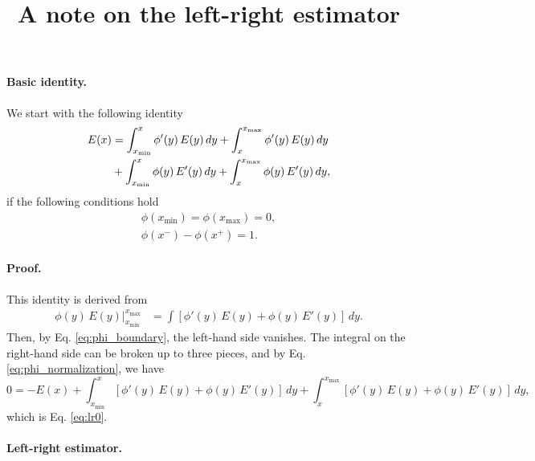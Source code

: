 \documentclass[12pt]{article}
\begin{document}
\title{A note on the left-right estimator}
\author{ \vspace{-10ex} }
\date{ \vspace{-10ex} }
\maketitle



\paragraph{Basic identity.}



We start with the following identity
\begin{align}
  E(x)
&=
  \int_{x_{\min}}^x \phi'(y) \, E(y) \, dy
  +
  \int_x^{x_{\max}} \phi'(y) \, E(y) \, dy
\notag
\\
&
  +
  \int_{x_{\min}}^x \phi(y) \, E'(y) \, dy
  +
  \int_x^{x_{\max}} \phi(y) \, E'(y) \, dy,
\label{eq:lr0}
\end{align}
if the following conditions hold
%
\begin{align}
  \phi(x_{\min}) = \phi(x_{\max}) = 0,
  \label{eq:phi_boundary}
\\
  \phi(x^{-}) - \phi(x^{+}) = 1.
  \label{eq:phi_normalization}
\end{align}


\paragraph{Proof.}



This identity is derived from
%
\begin{align*}
  \phi(y) \, E(y) \Big|_{x_{\min}}^{x_{\max}}
&=
  \int [\phi'(y) \, E(y) + \phi(y) \, E'(y)] \, dy.
\end{align*}
%
Then, by Eq. \eqref{eq:phi_boundary},
the left-hand side vanishes.
%
The integral on the right-hand side
can be broken up to three pieces,
and by Eq. \eqref{eq:phi_normalization},
we have
\[
0=-E(x)
+
  \int_{x_{\min}}^{x} [\phi'(y) \, E(y) + \phi(y) \, E'(y)] \, dy
+
  \int_{x}^{x_{\max}} [\phi'(y) \, E(y) + \phi(y) \, E'(y)] \, dy,
\]
which is Eq. \eqref{eq:lr0}.



\paragraph{Left-right estimator.}
\end{document}
